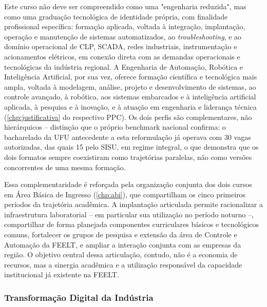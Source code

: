 Este curso não deve ser compreendido como uma "engenharia reduzida", mas como uma graduação tecnológica de identidade própria, com finalidade profissional específica: formação aplicada, voltada à integração, implantação, operação e manutenção de sistemas automatizados, ao \textit{troubleshooting}, e ao domínio operacional de CLP, SCADA, redes industriais, instrumentação e acionamentos elétricos, em conexão direta com as demandas operacionais e tecnológicas da indústria regional. A Engenharia de Automação, Robótica e Inteligência Artificial, por sua vez, oferece formação científica e tecnológica mais ampla, voltada à modelagem, análise, projeto e desenvolvimento de sistemas, ao controle avançado, à robótica, aos sistemas embarcados e à inteligência artificial aplicada, à pesquisa e à inovação, e à atuação em engenharia e liderança técnica (\autoref{chp:justificativa} do respectivo PPC). Os dois perfis são complementares, não hierárquicos -- distinção que o próprio benchmark nacional confirma: o bacharelado da UFU antecedente a esta reformulação já operava com 30 vagas autorizadas, das quais 15 pelo SISU, em regime integral, o que demonstra que os dois formatos sempre coexistiram como trajetórias paralelas, não como versões concorrentes de uma mesma formação.

Essa complementaridade é reforçada pela organização conjunta dos dois cursos em Área Básica de Ingresso (\autoref{chp:abi}), que compartilham os cinco primeiros períodos da trajetória acadêmica. A implantação articulada permite racionalizar a infraestrutura laboratorial -- em particular sua utilização no período noturno --, compartilhar de forma planejada componentes curriculares básicos e tecnológicos comuns, fortalecer os grupos de pesquisa e extensão da área de Controle e Automação da FEELT, e ampliar a interação conjunta com as empresas da região. O objetivo central dessa articulação, contudo, não é a economia de recursos, mas a sinergia acadêmica e a utilização responsável da capacidade institucional já existente na FEELT.

\subsubsection{Transformação Digital da Indústria}

